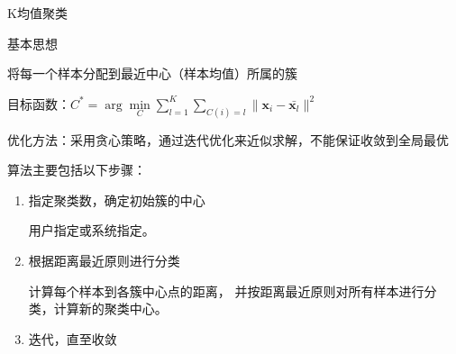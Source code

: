\textcolor{main1}{K均值聚类}
\begin{note}
    基本思想
    
    将每一个样本分配到最近中心（样本均值）所属的簇

    \textcolor{main1}{目标函数：}$C^{*} = \arg\min\limits_{C}\sum\limits_{l = 1}^{K}\sum\limits_{C(i) = l}\|\boldsymbol{x}_i-\bar{\boldsymbol{x}_l}\|^2$

    \textcolor{main1}{优化方法：}采用贪心策略，通过迭代优化来近似求解，不能保证收敛到全局最优

    算法主要包括以下步骤：
    \begin{enumerate}
        \item 指定聚类数，确定初始簇的中心
        
        用户指定或系统指定。
        \item 根据距离最近原则进行分类
        
        计算每个样本到各簇中心点的距离， 并按距离最近原则对所有样本进行分类，计算新的聚类中心。
        \item 迭代，直至收敛
    \end{enumerate}
\end{note}
